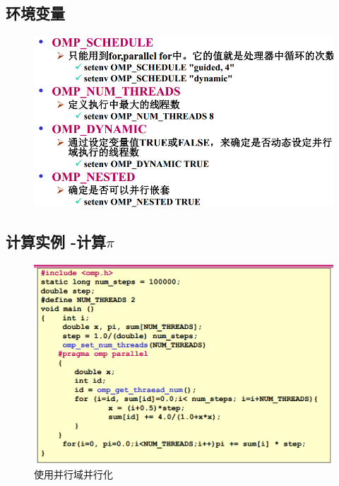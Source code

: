 \documentclass[UTF8,a4paper]{ctexart}
\begin{document}
\subsection{环境变量}
\begin{figure}[H]
  \centering
  \includegraphics[scale = 0.3]{assets/ParallelComputing_ac643.png}
\end{figure}


\subsection{计算实例 -计算$\pi$}
\begin{figure}[H]
  \centering
  \includegraphics[scale = 0.3]{assets/ParallelComputing_4ef23.png}
  \caption{使用并行域并行化}
\end{figure}
\end{document}
